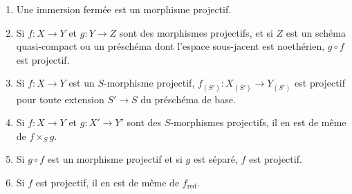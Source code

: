 \begin{proposition}[5.5.5]
\label{II.5.5.5-fr}
\begin{enumerate}
  \item[\rm{(i)}] Une immersion fermée est un morphisme projectif.
  \item[\rm{(ii)}] Si $f:X\to Y$ et $g:Y\to Z$ sont des morphismes
  projectifs, et si $Z$ est un schéma quasi-compact ou un préschéma dont
  l'espace sous-jacent est noethérien, $g\circ f$ est projectif.
  \item[\rm{(iii)}] Si $f:X\to Y$ est un $S$-morphisme projectif,
  $f_{(S')}:X_{(S')}\to Y_{(S')}$ est projectif pour toute extension
  $S'\to S$ du préschéma de base.
  \item[\rm{(iv)}] Si $f:X\to Y$ et $g:X'\to Y'$ sont des $S$-morphismes
  projectifs, il en est de même de $f\times_Sg$.
  \item[\rm{(v)}] Si $g\circ f$ est un morphisme projectif et si $g$ est
  séparé, $f$ est projectif.
  \item[\rm{(vi)}] Si $f$ est projectif, il en est de même de
  $f_{\mathrm{red}}$.
\end{enumerate}
\end{proposition}


